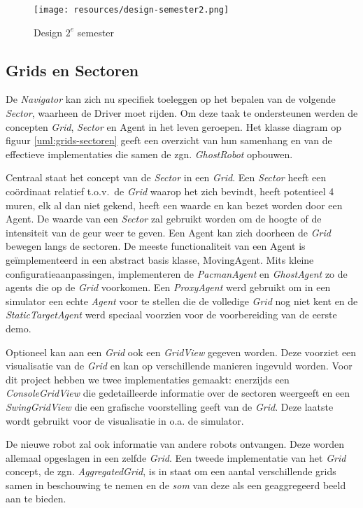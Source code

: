 \documentclass[12pt,a4paper]{report}
\begin{document}
\begin{figure}[htbp]
  \centering
  \texttt{[image: resources/design-semester2.png]}
  \caption{Design $2^e$ semester}
  \label{uml:design-semster2}
\end{figure}

\subsection{Grids en Sectoren}

De \emph{Navigator} kan zich nu specifiek toeleggen op het bepalen van de volgende \emph{Sector}, waarheen de Driver moet rijden. Om deze taak te ondersteunen werden de concepten \emph{Grid}, \emph{Sector} en Agent in het leven geroepen. Het klasse diagram op figuur \ref{uml:grids-sectoren} geeft een overzicht van hun samenhang en van de effectieve implementaties die samen de zgn. \emph{GhostRobot} opbouwen.

Centraal staat het concept van de \emph{Sector} in een \emph{Grid}. Een \emph{Sector} heeft een co\"ordinaat relatief t.o.v.\ de \emph{Grid} waarop het zich bevindt, heeft potentieel 4 muren, elk al dan niet gekend, heeft een waarde en kan bezet worden door een Agent. De waarde van een \emph{Sector} zal gebruikt worden om de hoogte of de intensiteit van de geur weer te geven. Een Agent kan zich doorheen de \emph{Grid} bewegen langs de sectoren. De meeste functionaliteit van een Agent is ge\"implementeerd in een abstract basis klasse, MovingAgent. Mits kleine configuratieaanpassingen, implementeren de \emph{PacmanAgent} en \emph{GhostAgent} zo de agents die op de \emph{Grid} voorkomen. Een \emph{ProxyAgent} werd gebruikt om in een simulator een echte \emph{Agent} voor te stellen die de volledige \emph{Grid} nog niet kent en de \emph{StaticTargetAgent} werd speciaal voorzien voor de voorbereiding van de eerste demo.

Optioneel kan aan een \emph{Grid} ook een \emph{GridView} gegeven worden. Deze voorziet een visualisatie van de \emph{Grid} en kan op verschillende manieren ingevuld worden. Voor dit project hebben we twee implementaties gemaakt: enerzijds een \emph{ConsoleGridView} die gedetailleerde informatie over de sectoren weergeeft en een \emph{SwingGridView} die een grafische voorstelling geeft van de \emph{Grid}. Deze laatste wordt gebruikt voor de visualisatie in o.a. de simulator.

De nieuwe robot zal ook informatie van andere robots ontvangen. Deze worden allemaal opgeslagen in een zelfde \emph{Grid}. Een tweede implementatie van het \emph{Grid} concept, de zgn. \emph{AggregatedGrid}, is in staat om een aantal verschillende grids samen in beschouwing te nemen en de \emph{som} van deze als een geaggregeerd beeld aan te bieden.
\end{document}
